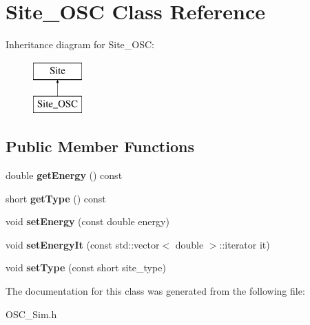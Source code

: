 \hypertarget{class_site___o_s_c}{}\section{Site\+\_\+\+O\+SC Class Reference}
\label{class_site___o_s_c}
Inheritance diagram for Site\+\_\+\+O\+SC\+:\begin{figure}[H]
\begin{center}
\leavevmode
\includegraphics[height=2.000000cm]{class_site___o_s_c}
\end{center}
\end{figure}
\subsection*{Public Member Functions}
\begin{DoxyCompactItemize}
\item 
\mbox{\label{class_site___o_s_c_a59db8200675439b98f42d3c35310fe68}} 
double {\bfseries get\+Energy} () const
\item 
\mbox{\label{class_site___o_s_c_a704a0a9fe1bab69db8343f5225d5888e}} 
short {\bfseries get\+Type} () const
\item 
\mbox{\label{class_site___o_s_c_ac7751de2f821aa8562793f8636027313}} 
void {\bfseries set\+Energy} (const double energy)
\item 
\mbox{\label{class_site___o_s_c_a22e8a3f697fa69d6a382e91c78a181b3}} 
void {\bfseries set\+Energy\+It} (const std\+::vector$<$ double $>$\+::iterator it)
\item 
\mbox{\label{class_site___o_s_c_a47f7ed4c7e916e01bd5cfc37599babb6}} 
void {\bfseries set\+Type} (const short site\+\_\+type)
\end{DoxyCompactItemize}


The documentation for this class was generated from the following file\+:\begin{DoxyCompactItemize}
\item 
O\+S\+C\+\_\+\+Sim.\+h\end{DoxyCompactItemize}

